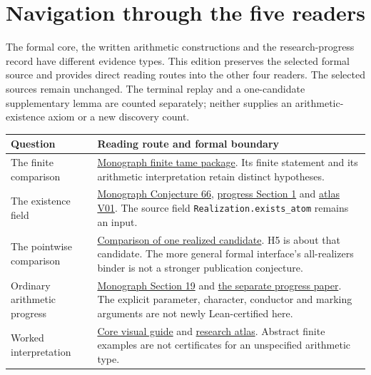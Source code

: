 \clearpage
\section*{Navigation through the five readers}
{}
The formal core, the written arithmetic constructions and the research-progress record have different evidence types. This edition preserves the selected formal source and provides direct reading routes into the other four readers. The selected sources remain unchanged. The terminal replay and a one-candidate supplementary lemma are counted separately; neither supplies an arithmetic-existence axiom or a new discovery count.

\begin{tabular}{@{}>{\raggedright\arraybackslash}p{.29\linewidth}>{\raggedright\arraybackslash}p{.66\linewidth}@{}}\toprule
Question & Reading route and formal boundary\\\midrule
The finite comparison & \href{https://komorebi.invalid/b07/lean_finite}{Monograph finite tame package}. Its finite statement and its arithmetic interpretation retain distinct hypotheses.\\[9pt]
The existence field & \href{https://komorebi.invalid/b07/lean_contract}{Monograph Conjecture 66}, \href{https://komorebi.invalid/b07/lean_research_contract}{progress Section 1} and \href{https://komorebi.invalid/b07/lean_v01}{atlas V01}. The source field \texttt{Realization.exists\_atom} remains an input.\\[9pt]
The pointwise comparison & \href{https://komorebi.invalid/b07/lean_comparison}{Comparison of one realized candidate}. H5 is about that candidate. The more general formal interface's all-realizers binder is not a stronger publication conjecture.\\[9pt]
Ordinary arithmetic progress & \href{https://komorebi.invalid/b07/lean_arithmetic}{Monograph Section 19} and \href{https://komorebi.invalid/b07/lean_progress}{the separate progress paper}. The explicit parameter, character, conductor and marking arguments are not newly Lean-certified here.\\[9pt]
Worked interpretation & \href{https://komorebi.invalid/b07/lean_core_visual}{Core visual guide} and \href{https://komorebi.invalid/b07/lean_atlas}{research atlas}. Abstract finite examples are not certificates for an unspecified arithmetic type.\\\bottomrule
\end{tabular}

